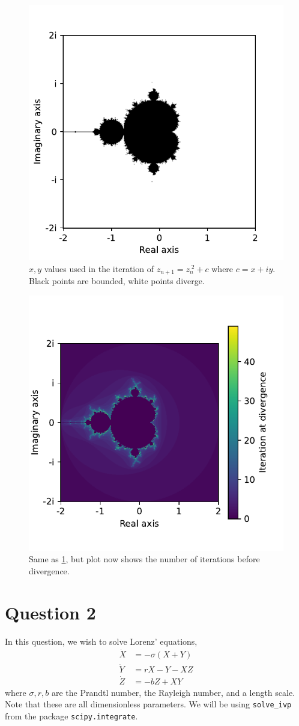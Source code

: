 \documentclass[a4paper,11pt]{article}
\theoremstyle{plain}
\theoremstyle{definition}
\theoremstyle{remark}
\begin{document}
\begin{figure}[H]
    \centering
    \includegraphics[width=0.65\linewidth]{../plots/a3q1_1.pdf}
    \caption{$x, y$ values used in the iteration of $z_{n+1}
    = z_n^{\; 2} + c$ where $c = x+iy$. Black points
    are bounded, white points diverge.}
    \label{q1:1}
\end{figure}
\begin{figure}[H]
    \centering
    \includegraphics[width=0.65\linewidth]{../plots/a3q1_2.pdf}
    \caption{Same as \cref{q1:1}, but plot now shows the number of
    iterations before divergence.}
    \label{q1:2}
\end{figure}

\section*{Question 2}
In this question, we wish to solve Lorenz' equations,
\begin{align}
    \dot{X} &= -\sigma(X+Y) \label{q2:eq1}\\
    \dot{Y} &= rX - Y - XZ\\
    \dot{Z} &= -bZ + XY \label{q2:eq3}
\end{align}
where $\sigma, r, b$ are the Prandtl number, the Rayleigh number, and
a length scale. Note that these are all dimensionless parameters. 
We will be using \texttt{solve\_ivp} from the package 
\texttt{scipy.integrate}.
\end{document}
